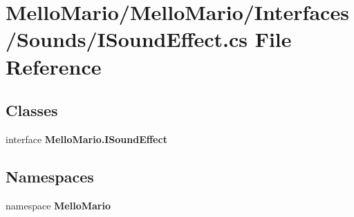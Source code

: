 \section{Mello\+Mario/\+Mello\+Mario/\+Interfaces/\+Sounds/\+I\+Sound\+Effect.cs File Reference}
\label{ISoundEffect_8cs}
\subsection*{Classes}
\begin{DoxyCompactItemize}
\item 
interface \textbf{ Mello\+Mario.\+I\+Sound\+Effect}
\end{DoxyCompactItemize}
\subsection*{Namespaces}
\begin{DoxyCompactItemize}
\item 
namespace \textbf{ Mello\+Mario}
\end{DoxyCompactItemize}
